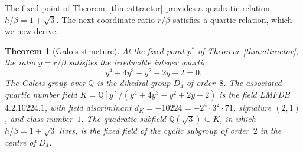 \documentclass[11pt,reqno]{amsart}
\theoremstyle{plain}
\newtheorem{theorem}{Theorem}
\theoremstyle{definition}
\theoremstyle{remark}
\newcommand{\Q}{\mathbb{Q}}
\begin{document}
The fixed point of Theorem~\ref{thm:attractor} provides a
quadratic relation $h/\beta=1+\sqrt{3}$. The next-coordinate
ratio $r/\beta$ satisfies a quartic relation, which we now derive.

\begin{theorem}[Galois structure]\label{thm:galois}
At the fixed point $p^{*}$ of Theorem~\ref{thm:attractor}, the
ratio $y=r/\beta$ satisfies the irreducible integer quartic
\begin{equation}\label{eq:quartic}
y^{4}+4y^{3}-y^{2}+2y-2=0.
\end{equation}
The Galois group over $\Q$ is the dihedral group $D_{4}$ of
order~$8$. The associated quartic number field
$K=\Q[y]/(y^{4}+4y^{3}-y^{2}+2y-2)$ is the field LMFDB
\textnumero $4.2.10224.1$, with field discriminant
$d_{K}=-10224=-2^{4}\cdot 3^{2}\cdot 71$, signature $(2,1)$, and
class number~$1$. The quadratic subfield $\Q(\sqrt{3})\subseteq K$,
in which $h/\beta=1+\sqrt{3}$ lives, is the fixed field of the
cyclic subgroup of order~$2$ in the centre of $D_{4}$.
\end{theorem}
\end{document}
